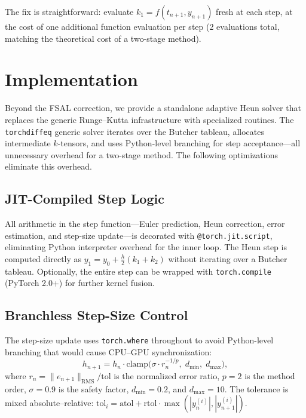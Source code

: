 \documentclass[11pt]{article}
\begin{document}
The fix is straightforward: evaluate $k_1 = f(t_{n+1}, y_{n+1})$ fresh
at each step, at the cost of one additional function evaluation per
step (2 evaluations total, matching the theoretical cost of a
two-stage method).

\section{Implementation}
\label{sec:impl}

Beyond the FSAL correction, we provide a standalone adaptive Heun solver
that replaces the generic Runge--Kutta infrastructure with specialized
routines.  The \texttt{torchdiffeq} generic solver iterates over the
Butcher tableau, allocates intermediate $k$-tensors, and uses
Python-level branching for step acceptance---all unnecessary overhead for
a two-stage method.  The following optimizations eliminate this overhead.

\subsection{JIT-Compiled Step Logic}

All arithmetic in the step function---Euler prediction, Heun correction,
error estimation, and step-size update---is decorated with
\texttt{@torch.jit.script}, eliminating Python interpreter overhead for
the inner loop.  The Heun step is computed directly as
$y_1 = y_0 + \tfrac{h}{2}(k_1 + k_2)$ without iterating over a
Butcher tableau.  Optionally, the entire step can be wrapped with
\texttt{torch.compile} (PyTorch 2.0+) for further kernel fusion.

\subsection{Branchless Step-Size Control}

The step-size update uses \texttt{torch.where} throughout to avoid
Python-level branching that would cause CPU--GPU synchronization:
\begin{equation}
  h_{n+1} = h_n \cdot \text{clamp}\!\bigl(
    \sigma \cdot r_n^{-1/p},\; d_{\min},\; d_{\max}
  \bigr),
  \label{eq:step_ctrl}
\end{equation}
where $r_n = \|e_{n+1}\|_{\text{RMS}} / \text{tol}$ is the normalized
error ratio, $p = 2$ is the method order, $\sigma = 0.9$ is the safety
factor, $d_{\min} = 0.2$, and $d_{\max} = 10$.  The tolerance is
mixed absolute--relative:
$\text{tol}_i = \text{atol} + \text{rtol} \cdot
\max(|y_n^{(i)}|, |y_{n+1}^{(i)}|)$.
\end{document}
